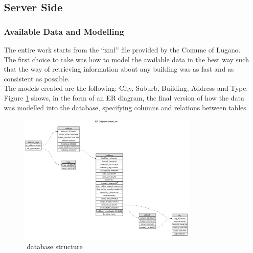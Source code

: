 \subsection{Server Side}
\subsubsection{Available Data and Modelling}
The entire work starts from the ``xml'' file provided by the Comune of Lugano. The first choice to take was how to model the available data in the best way such that the way of retrieving information about any building was as fast and as consistent as possible.\\
The models created are the following: City, Suburb, Building, Address and Type. Figure \ref{fig:db_structure} shows, in the form of an ER diagram, the final version of how the data was modelled into the database, specifying columns and relations between tables.
\begin{figure}[H]
\centering
\includegraphics[width=0.8\textwidth]{chapter3/images/db_structure}
\caption{\applicationName\ database structure}
\label{fig:db_structure}
\end{figure}
